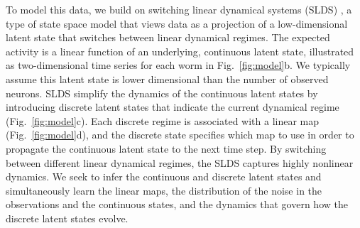 \documentclass[11pt]{article}
\begin{document}
To model this data, we build on switching linear dynamical systems
(SLDS) \citep{chang1978state, ackerson1970state, hamilton1990analysis,
  ghahramani1996switching, murphy1998switching}, a type of state space
model that views data as a projection of a low-dimensional latent
state that switches between linear dynamical regimes.  The expected
activity is a linear function of an underlying, continuous latent
state, illustrated as two-dimensional time series for each worm in
Fig.~\ref{fig:model}b.  We typically assume this latent state is lower
dimensional than the number of observed neurons. SLDS simplify the
dynamics of the continuous latent states by introducing discrete
latent states that indicate the current dynamical regime
(Fig.~\ref{fig:model}c).  Each discrete regime is associated with a
linear map (Fig.~\ref{fig:model}d), and the discrete state specifies
which map to use in order to propagate the continuous latent state to
the next time step.  By switching between different linear dynamical
regimes, the SLDS captures highly nonlinear dynamics.  We seek to
infer the continuous and discrete latent states and simultaneously
learn the linear maps, the distribution of the noise in the
observations and the continuous states, and the dynamics that govern
how the discrete latent states evolve.
\end{document}
